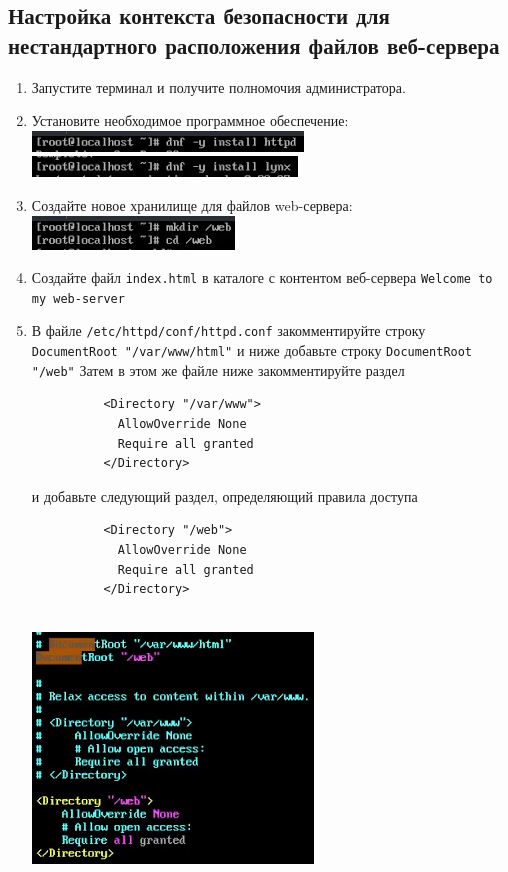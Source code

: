 \documentclass[12pt]{article}
\begin{document}
\subsection{Настройка контекста безопасности для нестандартного расположения файлов веб-сервера}
\begin{enumerate}
	\item Запустите терминал и получите полномочия администратора.
	\item Установите необходимое программное обеспечение:
	      \\\includegraphics{15.png}
	      \\\includegraphics{15_1.png}
	\item Создайте новое хранилище для файлов web-сервера:
	      \\\includegraphics{16.png}
	\item Создайте файл \texttt{index.html} в каталоге с контентом веб-сервера \texttt{Welcome to my web-server}
	\item В файле \texttt{/etc/httpd/conf/httpd.conf} закомментируйте строку \texttt{DocumentRoot "/var/www/html"} и ниже добавьте строку \texttt{DocumentRoot "/web"} Затем в этом же файле ниже закомментируйте раздел \\
	      \begin{verbatim}
          <Directory "/var/www">
            AllowOverride None
            Require all granted
          </Directory>
        \end{verbatim}
	      и добавьте следующий раздел, определяющий правила доступа \\
	      \begin{verbatim}
          <Directory "/web">
            AllowOverride None
            Require all granted
          </Directory>
        \end{verbatim}
	      \\\includegraphics{17.png}

\end{enumerate}
\end{document}
